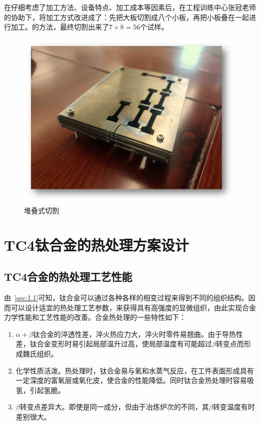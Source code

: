 在仔细考虑了加工方法、设备特点、加工成本等因素后，在工程训练中心张冠老师的协助下，将加工方式改进成了：先把大板切割成八个小板，再把小板叠在一起进行加工。的方法，最终切割出来了$ 7\times 8=56 $个试样。
\begin{figure}[h!]
	\centering
	\includegraphics[width=0.7\linewidth]{pic/堆叠式切割}
	\caption{堆叠式切割}
	\label{fig:goodway}
\end{figure}

\section{TC4钛合金的热处理方案设计}
\subsection{TC4合金的热处理工艺性能}
由~\ref{sec:1.1}可知，钛合金可以通过各种各样的相变过程来得到不同的组织结构。因而可以设计适宜的热处理工艺参数，来获得具有高强度的显微组织，由此实现\ti 合金力学性能和工艺性能的改善。\ti 合金热处理的一些特性如下：
\begin{enumerate}
	\item $\alpha+\beta$钛合金的淬透性差，淬火热应力大，淬火时零件易翘曲。由于导热性差，钛合金变形时易引起局部温升过高，使局部温度有可能超过$\beta$转变点而形成魏氏组织。
	\item 化学性质活泼。热处理时，钛合金易与氧和水蒸气反应，在工件表面形成具有一定深度的富氧层或氧化皮，使合金的性能降低。同时钛合金热处理时容易吸氢，引起氢脆。
	\item $\beta$转变点差异大。即使是同一成分，但由于冶炼炉次的不同，其$\beta$转变温度有时差别很大。
\end{enumerate}
